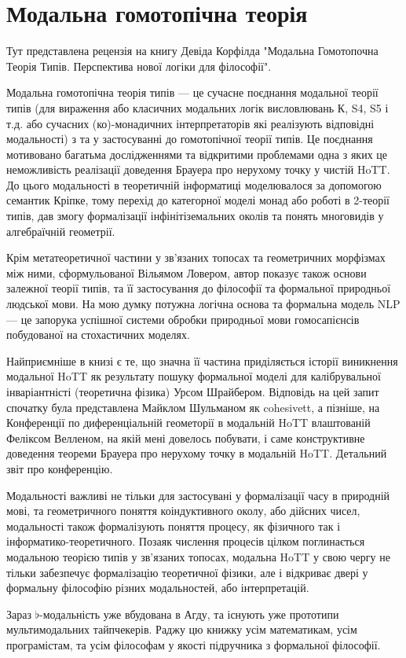 \section{Модальна гомотопічна теорія}

Тут представлена рецензія на книгу Девіда
Корфілда "Модальна Гомотопочна Теорія Типів.
Перспектива нової логіки для філософії".

Модальна гомотопічна теорія типів --- це сучасне
поєднання модальної теорії типів (для вираження
або класичних модальних логік висловлювань К, S4, S5 і т.д. або
сучасних (ко)-монадичних інтерпретаторів які реалізують
відповідні модальності) з та у застосуванні до гомотопічної
теорії типів. Це поєднання мотивовано багатьма дослідженнями
та відкритими проблемами одна з яких це неможливість реалізації
доведення Брауера про нерухому точку у чистій HoTT. До цього
модальності в теоретичній інформатиці моделювалося за допомогою
семантик Кріпке, тому перехід до категорної моделі монад або
роботі в 2-теорії типів, дав змогу формалізації інфінітіземальних
околів та понять многовидів у алгебраїчній геометрії.

Крім метатеоретичної частини у зв'язаних топосах та геометричних
морфізмах між ними, сформульованої Вільямом Ловером, автор
показує також основи залежної теорії типів, та її застосування
до філософії та формальної природньої людської мови. На мою думку
потужна логічна основа та формальна модель NLP --- це запорука
успішної системи обробки природньої мови гомосапієнсів побудованої
на стохастичних моделях.

Найприємніше в книзі є те, що значна її частина приділяється
історії виникнення модальної HoTT як результату пошуку формальної
моделі для калібрувальної інваріантністі (теоретична фізика) Урсом
Шрайбером. Відповідь на цей запит спочатку була представлена Майклом
Шульманом як cohesivett, а пізніше, на Конференції по диференціальній
геометорії в модальній HoTT влаштованій Феліксом Велленом, на якій
мені довелось побувати, і саме конструктивне доведення теореми Брауера
про нерухому точку в модальній HoTT. Детальний звіт про конференцію.

Модальності важливі не тільки для застосувані у формалізації
часу в природній мові, та геометричного поняття коіндуктивного
околу, або дійсних чисел, модальності також формалізують поняття
процесу, як фізичного так і інформатико-теоретичного. Позаяк числення
процесів цілком поглинається модальною теорією типів у зв'язаних
топосах, модальна HoTT у свою чергу не тільки забезпечує формалізацію
теоретичної фізики, але і відкриває двері у формальну філософію різних
модальностей, або інтерпретацій.

Зараз $\flat$-модальність уже вбудована в Агду, та існують уже прототипи
мультимодальних тайпчекерів. Раджу цю книжку усім математикам, усім
програмістам, та усім філософам у якості підручника з формальної філософії.
